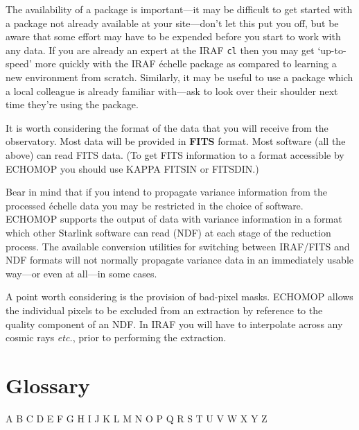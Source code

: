 \documentclass[twoside,11pt]{article}
\newcommand{\stardocinitials}  {SG}
\newcommand{\stardocnumber}    {9.2}
\newcommand{\stardocname}{\stardocinitials /\stardocnumber}
\newcommand{\htmlref}[2]{#1}
\newcommand{\xref}[3]{#1}
\newcommand{\xlabel}[1]{}
\newcommand{\sgspec}[2]{#1}
\newcommand{\sgspec}[2]{#2}
\begin{document}
The availability of a package is important\sgspec{---}{ - }it may be difficult
to get started with a package not already available at your
site\sgspec{---}{ - }don't let this put you off, but be aware that some effort
may have to be expended before you start to work with any data.
If you are already an expert at the IRAF {\tt cl} then you may get
`up-to-speed' more quickly with the IRAF \'{e}chelle package as compared
to learning a new environment from scratch.
Similarly, it may be useful to use a package which a local colleague is
already familiar with\sgspec{---}{ - }ask to look over their shoulder next
time they're using the package.

It is worth considering the format of the data that you will receive
from the observatory.  Most data will be provided in
\htmlref{{\bf FITS}}{gl_fits} format.
Most software (all the above) can read FITS data.  (To get FITS information to
a format accessible by ECHOMOP you should use \xref{KAPPA}{sun95}{}
\xref{FITSIN}{sun95}{FITSIN} or \xref{FITSDIN}{sun95}{FITSDIN}.)

Bear in mind that if you
intend to propagate variance information from the processed \'{e}chelle
data you may be restricted in the choice of software.  ECHOMOP supports
the output of data with variance information in a format which other
Starlink software can read (\xref{NDF}{sun33}{}) at each stage of the
reduction process.
The available conversion utilities for switching between IRAF/FITS and
NDF formats will not normally propagate variance data in an immediately
usable way\sgspec{---}{ - }or even at all\sgspec{---}{ - }in some cases.

A point worth considering is the provision of bad-pixel masks.
ECHOMOP allows the individual pixels to be excluded from an extraction
by reference to the quality component of an NDF\@.  In IRAF you will
have to interpolate across any cosmic rays {\em etc.}, prior to
performing the extraction.

\newpage
\section{\label{se_glossary}\xlabel{glossary}Glossary}
\markboth{Glossary}{\stardocname}

\begin{htmlonly}
\htmlref{A}{gl_adu}
\htmlref{B}{gl_bias_frame}
\htmlref{C}{gl_centroiding}
\htmlref{D}{gl_dark_current}
\htmlref{E}{gl_echelle}
\htmlref{F}{gl_figaro}
\htmlref{G}{gl_ccd_gain}
\htmlref{H}{gl_halation}
\htmlref{I}{gl_ids}
\htmlref{J}{gl_jkt}
\htmlref{K}{gl_kappa}
L
\htmlref{M}{gl_midas}
\htmlref{N}{gl_ndf}
\htmlref{O}{gl_order_separation}
\htmlref{P}{gl_periscopes}
\htmlref{Q}{gl_qe}
\htmlref{R}{gl_readout_noise}
\htmlref{S}{gl_scanning}
\htmlref{T}{gl_template_order}
\htmlref{U}{gl_ucles}
\htmlref{V}{gl_vlt}
\htmlref{W}{gl_wht}
X
Y
\htmlref{Z}{gl_zero_sub}
\end{htmlonly}
\end{document}

